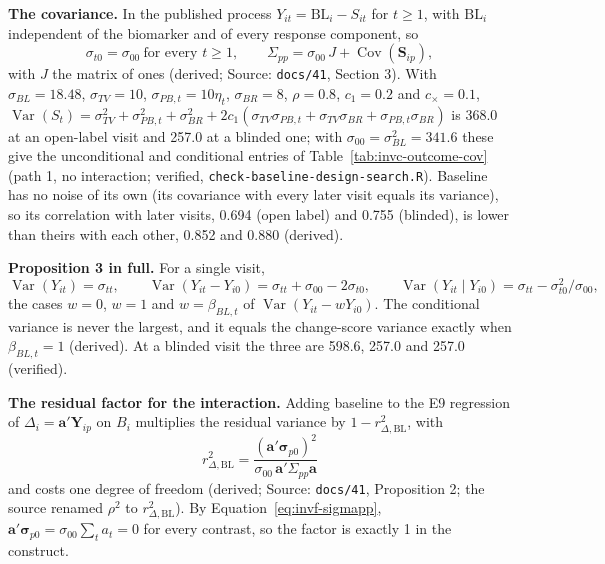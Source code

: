 \documentclass[11pt]{article}
\newcommand{\code}[1]{\texttt{#1}}
\begin{document}
\textbf{The covariance.} In the published process
$Y_{it} = \mathrm{BL}_i - S_{it}$ for $t \ge 1$, with $\mathrm{BL}_i$
independent of the biomarker and of every response component, so
\begin{equation}
\sigma_{t0} = \sigma_{00} \ \text{for every } t \ge 1, \qquad
\Sigma_{pp} = \sigma_{00}\,J + \operatorname{Cov}(\mathbf S_{ip}),
\label{eq:invf-sigmapp}
\end{equation}
with $J$ the matrix of ones (derived; Source: \code{docs/41}, Section 3).
With $\sigma_{BL} = 18.48$, $\sigma_{TV} = 10$, $\sigma_{PB,t} =
10\eta_t$, $\sigma_{BR} = 8$, $\rho = 0.8$, $c_1 = 0.2$ and $c_\times =
0.1$, $\operatorname{Var}(S_t) = \sigma_{TV}^2 + \sigma_{PB,t}^2 +
\sigma_{BR}^2 + 2c_1(\sigma_{TV}\sigma_{PB,t} + \sigma_{TV}\sigma_{BR} +
\sigma_{PB,t}\sigma_{BR})$ is 368.0 at an open-label visit and 257.0 at a
blinded one; with $\sigma_{00} = \sigma_{BL}^2 = 341.6$ these give the
unconditional and conditional entries of
Table~\ref{tab:invc-outcome-cov} (path 1, no interaction; verified,
\code{check-baseline-design-search.R}). Baseline has no noise of its own (its
covariance with every later visit equals its variance), so its
correlation with later visits, 0.694 (open label) and 0.755 (blinded),
is lower than theirs with each other, 0.852 and 0.880 (derived).

\textbf{Proposition 3 in full.} For a single visit,
\begin{equation}
\operatorname{Var}(Y_{it}) = \sigma_{tt}, \qquad
\operatorname{Var}(Y_{it} - Y_{i0}) = \sigma_{tt} + \sigma_{00}
  - 2\sigma_{t0}, \qquad
\operatorname{Var}(Y_{it} \mid Y_{i0}) = \sigma_{tt}
  - \sigma_{t0}^2/\sigma_{00},
\label{eq:invf-prop3}
\end{equation}
the cases $w = 0$, $w = 1$ and $w = \beta_{BL,t}$ of
$\operatorname{Var}(Y_{it} - wY_{i0})$. The conditional variance is never
the largest, and it equals the change-score variance exactly when
$\beta_{BL,t} = 1$ (derived). At a blinded visit the three are 598.6, 257.0 and
257.0 (verified).

\textbf{The residual factor for the interaction.} Adding baseline to the
E9 regression of $\Delta_i = \mathbf a'\mathbf Y_{ip}$ on $B_i$ multiplies
the residual variance by $1 - r^2_{\Delta,\mathrm{BL}}$, with
\begin{equation}
r^2_{\Delta,\mathrm{BL}} = \frac{(\mathbf a'\boldsymbol\sigma_{p0})^2}
  {\sigma_{00}\,\mathbf a'\Sigma_{pp}\mathbf a}
\label{eq:invf-r2}
\end{equation}
and costs one degree of freedom (derived; Source: \code{docs/41},
Proposition 2; the source renamed $\rho^2$ to $r^2_{\Delta,\mathrm{BL}}$).
By Equation~\eqref{eq:invf-sigmapp}, $\mathbf a'\boldsymbol\sigma_{p0} =
\sigma_{00}\sum_t a_t = 0$ for every contrast, so the factor is exactly 1
in the construct.
\end{document}

